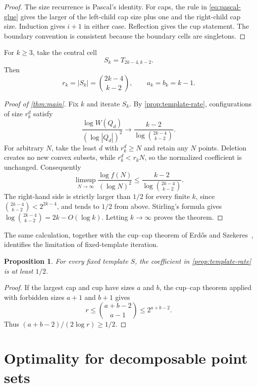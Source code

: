 \documentclass[11pt]{article}
\newtheorem{proposition}[theorem]{Proposition}
\theoremstyle{remark}
\begin{document}
\begin{proof}
The size recurrence is Pascal's identity.  For caps, the rule in
\eqref{eq:pascal-glue} gives the larger of the left-child cap size plus one and the
right-child cap size.  Induction gives $i+1$ in either case.  Reflection
gives the cup statement.  The boundary convention is consistent because
the boundary cells are singletons.
\end{proof}

For $k\ge3$, take the central cell
\[
 S_k=T_{2k-4,k-2}.                                \tag{4.2}
\]
Then
\[
 r_k=|S_k|=\binom{2k-4}{k-2},\qquad a_k=b_k=k-1. \tag{4.3}
\]

\begin{proof}[Proof of \cref{thm:main}]
Fix $k$ and iterate $S_k$.  By \cref{prop:template-rate}, configurations
of size $r_k^d$ satisfy
\[
 \frac{\log W(Q_d)}{(\log|Q_d|)^2}
 \longrightarrow
 \frac{k-2}{\log\binom{2k-4}{k-2}}.              \tag{4.4}
\]
For arbitrary $N$, take the least $d$ with $r_k^d\ge N$ and retain any
$N$ points.  Deletion creates no new convex subsets, while
$r_k^d<r_kN$, so the normalized coefficient is unchanged.  Consequently
\[
 \limsup_{N\to\infty}
 \frac{\log f(N)}{(\log N)^2}
 \le \frac{k-2}{\log\binom{2k-4}{k-2}}.          \tag{4.5}
\]
The right-hand side is strictly larger than $1/2$ for every finite $k$,
since $\binom{2k-4}{k-2}<2^{2k-4}$, and tends to $1/2$ from above.
Stirling's formula gives
$\log\binom{2k-4}{k-2}=2k-O(\log k)$.  Letting $k\to\infty$ proves the
theorem.
\end{proof}

The same calculation, together with the cup--cap theorem of Erd\H{o}s and
Szekeres~\cite{ErdosSzekeres1935}, identifies the limitation of
fixed-template iteration.

\begin{proposition}\label{prop:barrier}
For every fixed template $S$, the coefficient in
\cref{prop:template-rate} is at least $1/2$.
\end{proposition}

\begin{proof}
If the largest cap and cup have sizes $a$ and $b$, the cup--cap theorem
applied with forbidden sizes $a+1$ and $b+1$ gives
\[
 r\le\binom{a+b-2}{a-1}\le2^{a+b-2}.
\]
Thus $(a+b-2)/(2\log r)\ge1/2$.
\end{proof}

\section{Optimality for decomposable point sets}
\end{document}
